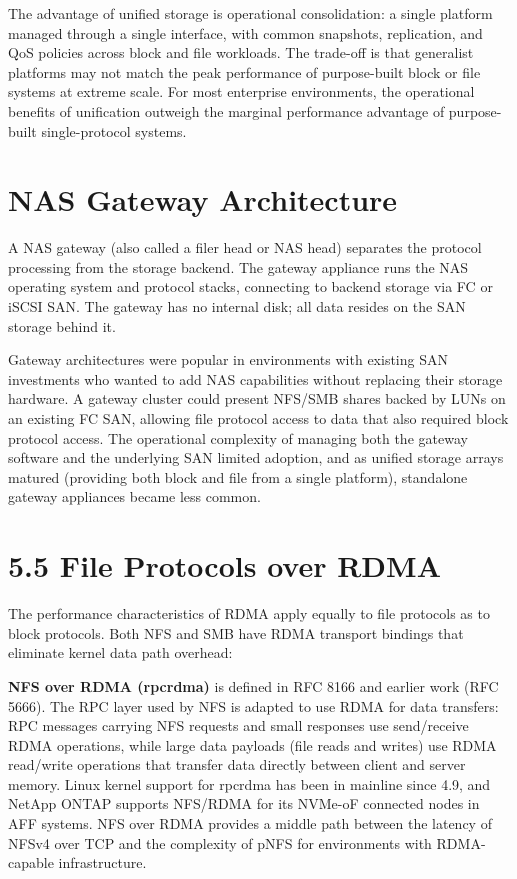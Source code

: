The advantage of unified storage is operational consolidation: a single platform managed through a single interface, with common snapshots, replication, and QoS policies across block and file workloads. The trade-off is that generalist platforms may not match the peak performance of purpose-built block or file systems at extreme scale. For most enterprise environments, the operational benefits of unification outweigh the marginal performance advantage of purpose-built single-protocol systems.

\section{NAS Gateway Architecture}
A NAS gateway (also called a filer head or NAS head) separates the protocol processing from the storage backend. The gateway appliance runs the NAS operating system and protocol stacks, connecting to backend storage via FC or iSCSI SAN. The gateway has no internal disk; all data resides on the SAN storage behind it.

Gateway architectures were popular in environments with existing SAN investments who wanted to add NAS capabilities without replacing their storage hardware. A gateway cluster could present NFS/SMB shares backed by LUNs on an existing FC SAN, allowing file protocol access to data that also required block protocol access. The operational complexity of managing both the gateway software and the underlying SAN limited adoption, and as unified storage arrays matured (providing both block and file from a single platform), standalone gateway appliances became less common.

\section{5.5 File Protocols over RDMA}
The performance characteristics of RDMA apply equally to file protocols as to block protocols. Both NFS and SMB have RDMA transport bindings that eliminate kernel data path overhead:

\textbf{NFS over RDMA (rpcrdma)} is defined in RFC 8166 and earlier work (RFC 5666). The RPC layer used by NFS is adapted to use RDMA for data transfers: RPC messages carrying NFS requests and small responses use send/receive RDMA operations, while large data payloads (file reads and writes) use RDMA read/write operations that transfer data directly between client and server memory. Linux kernel support for rpcrdma has been in mainline since 4.9, and NetApp ONTAP supports NFS/RDMA for its NVMe-oF connected nodes in AFF systems. NFS over RDMA provides a middle path between the latency of NFSv4 over TCP and the complexity of pNFS for environments with RDMA-capable infrastructure.

